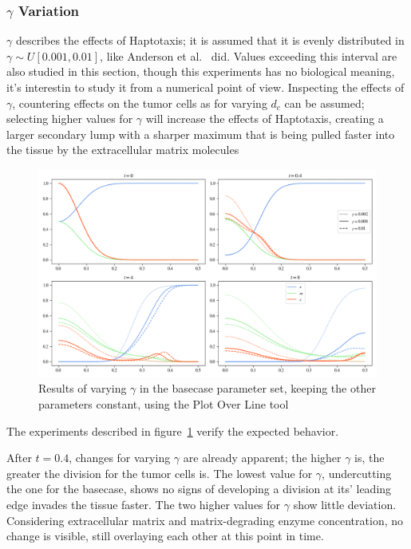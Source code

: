 \subsubsection*{$\gamma$ Variation}
$\gamma$ describes the effects of Haptotaxis; it is assumed that it is evenly distributed in $\gamma \sim U[0.001,0.01]$, like Anderson et al.~\cite{anderson_mathematical_2000} did. Values exceeding this interval are also studied in this section, though this experiments has no biological meaning, it's interestin to study it from a numerical point of view. Inspecting the effects of $\gamma$, countering effects on the tumor cells as for varying $d_c$ can be assumed; selecting higher values for $\gamma$ will increase the effects of Haptotaxis, creating a larger secondary lump with a sharper maximum that is being pulled faster into the tissue by the extracellular matrix molecules
\begin{figure}[h!]
 \centering
 \includegraphics[width=\textwidth]{resources/images/gamma_variation.png}
 \caption{Results of varying $\gamma$ in the basecase parameter set, keeping the other parameters constant, using the Plot Over Line tool}
 \label{fig:gamma_variation}
\end{figure}
The experiments described in figure~\ref{fig:gamma_variation} verify the expected behavior.

After $t=0.4$, changes for varying $\gamma$ are already apparent; the higher $\gamma$ is, the greater the division for the tumor cells is. The lowest value for $\gamma$, undercutting the one for the basecase, shows no signs of developing a division at its' leading edge invades the tissue faster. The two higher values for $\gamma$ show little deviation. Considering extracellular matrix and matrix-degrading enzyme concentration, no change is visible, still overlaying each other at this point in time.

